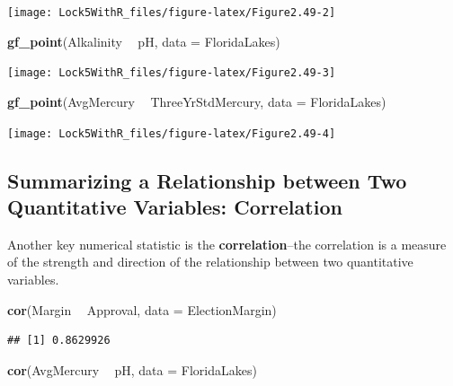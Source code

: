 \documentclass[]{book}
\newenvironment{Shaded}{\begin{snugshade}}{\end{snugshade}}
\newcommand{\DataTypeTok}[1]{\textcolor[rgb]{0.13,0.29,0.53}{#1}}
\newcommand{\KeywordTok}[1]{\textcolor[rgb]{0.13,0.29,0.53}{\textbf{#1}}}
\newcommand{\NormalTok}[1]{#1}
\newcommand{\OperatorTok}[1]{\textcolor[rgb]{0.81,0.36,0.00}{\textbf{#1}}}
\newcommand{\StringTok}[1]{\textcolor[rgb]{0.31,0.60,0.02}{#1}}
\begin{document}
\texttt{[image: Lock5WithR\_files/figure-latex/Figure2.49-2]}

\begin{Shaded}
\begin{Highlighting}[]
\KeywordTok{gf_point}\NormalTok{(Alkalinity }\OperatorTok{~}\StringTok{ }\NormalTok{pH, }\DataTypeTok{data =}\NormalTok{ FloridaLakes)}
\end{Highlighting}
\end{Shaded}

\texttt{[image: Lock5WithR\_files/figure-latex/Figure2.49-3]}

\begin{Shaded}
\begin{Highlighting}[]
\KeywordTok{gf_point}\NormalTok{(AvgMercury }\OperatorTok{~}\StringTok{ }\NormalTok{ThreeYrStdMercury, }\DataTypeTok{data =}\NormalTok{ FloridaLakes)}
\end{Highlighting}
\end{Shaded}

\texttt{[image: Lock5WithR\_files/figure-latex/Figure2.49-4]}

\hypertarget{summarizing-a-relationship-between-two-quantitative-variables-correlation}{%
\subsection{Summarizing a Relationship between Two Quantitative Variables: Correlation}\label{summarizing-a-relationship-between-two-quantitative-variables-correlation}}

Another key numerical statistic is the \textbf{correlation}--the correlation is a measure of the strength and direction of the relationship between two quantitative variables.

\begin{Shaded}
\begin{Highlighting}[]
\KeywordTok{cor}\NormalTok{(Margin }\OperatorTok{~}\StringTok{ }\NormalTok{Approval, }\DataTypeTok{data =}\NormalTok{ ElectionMargin)}
\end{Highlighting}
\end{Shaded}

\begin{verbatim}
## [1] 0.8629926
\end{verbatim}

\begin{Shaded}
\begin{Highlighting}[]
\KeywordTok{cor}\NormalTok{(AvgMercury }\OperatorTok{~}\StringTok{ }\NormalTok{pH, }\DataTypeTok{data =}\NormalTok{ FloridaLakes)}
\end{Highlighting}
\end{Shaded}
\end{document}
